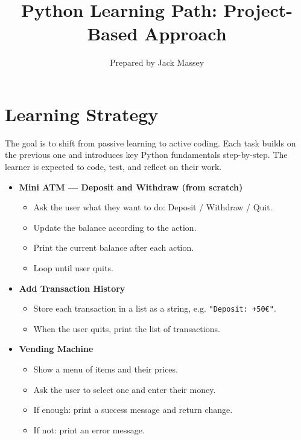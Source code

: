 \documentclass[a4paper,12pt]{article}
\title{Python Learning Path: Project-Based Approach}
\author{Prepared by Jack Massey}
\date{}
\begin{document}
\maketitle

\section*{Learning Strategy}
The goal is to shift from passive learning to active coding. Each task builds on the previous one and introduces key Python fundamentals step-by-step. The learner is expected to code, test, and reflect on their work.

\bigskip

\begin{tcolorbox}[title=Step-by-Step Progression, colback=blue!10, colframe=blue!40, breakable]
\begin{itemize}
    \item \textbf{Mini ATM — Deposit and Withdraw (from scratch)}
    \begin{itemize}
        \item Ask the user what they want to do: Deposit / Withdraw / Quit.
        \item Update the balance according to the action.
        \item Print the current balance after each action.
        \item Loop until user quits.
    \end{itemize}

    \item \textbf{Add Transaction History}
    \begin{itemize}
        \item Store each transaction in a list as a string, e.g. \texttt{"Deposit: +50€"}.
        \item When the user quits, print the list of transactions.
    \end{itemize}

    \item \textbf{Vending Machine}
    \begin{itemize}
        \item Show a menu of items and their prices.
        \item Ask the user to select one and enter their money.
        \item If enough: print a success message and return change.
        \item If not: print an error message.
    \end{itemize}
\end{itemize}
\end{tcolorbox}
\end{document}
